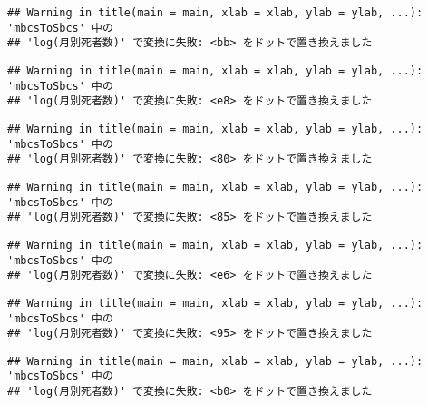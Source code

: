 \documentclass[]{article}
\begin{document}
\begin{verbatim}
## Warning in title(main = main, xlab = xlab, ylab = ylab, ...): 'mbcsToSbcs' 中の
## 'log(月別死者数)' で変換に失敗: <bb> をドットで置き換えました
\end{verbatim}

\begin{verbatim}
## Warning in title(main = main, xlab = xlab, ylab = ylab, ...): 'mbcsToSbcs' 中の
## 'log(月別死者数)' で変換に失敗: <e8> をドットで置き換えました
\end{verbatim}

\begin{verbatim}
## Warning in title(main = main, xlab = xlab, ylab = ylab, ...): 'mbcsToSbcs' 中の
## 'log(月別死者数)' で変換に失敗: <80> をドットで置き換えました
\end{verbatim}

\begin{verbatim}
## Warning in title(main = main, xlab = xlab, ylab = ylab, ...): 'mbcsToSbcs' 中の
## 'log(月別死者数)' で変換に失敗: <85> をドットで置き換えました
\end{verbatim}

\begin{verbatim}
## Warning in title(main = main, xlab = xlab, ylab = ylab, ...): 'mbcsToSbcs' 中の
## 'log(月別死者数)' で変換に失敗: <e6> をドットで置き換えました
\end{verbatim}

\begin{verbatim}
## Warning in title(main = main, xlab = xlab, ylab = ylab, ...): 'mbcsToSbcs' 中の
## 'log(月別死者数)' で変換に失敗: <95> をドットで置き換えました
\end{verbatim}

\begin{verbatim}
## Warning in title(main = main, xlab = xlab, ylab = ylab, ...): 'mbcsToSbcs' 中の
## 'log(月別死者数)' で変換に失敗: <b0> をドットで置き換えました
\end{verbatim}
\end{document}
